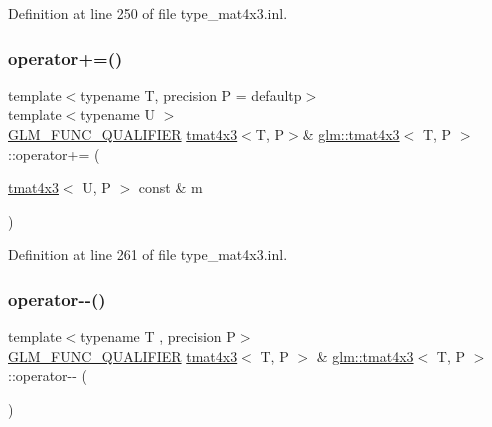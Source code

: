Definition at line 250 of file type\+\_\+mat4x3.\+inl.

\mbox{\label{structglm_1_1tmat4x3_ac3328dbd930d4608781f9199cc793d17}} 
\subsubsection{\texorpdfstring{operator+=()}{operator+=()}\hspace{0.1cm}{\footnotesize\ttfamily [4/4]}}
{\footnotesize\ttfamily template$<$typename T, precision P = defaultp$>$ \\
template$<$typename U $>$ \\
\mbox{\hyperlink{setup_8hpp_a33fdea6f91c5f834105f7415e2a64407}{G\+L\+M\+\_\+\+F\+U\+N\+C\+\_\+\+Q\+U\+A\+L\+I\+F\+I\+ER}} \mbox{\hyperlink{structglm_1_1tmat4x3}{tmat4x3}}$<$T, P$>$\& \mbox{\hyperlink{structglm_1_1tmat4x3}{glm\+::tmat4x3}}$<$ T, P $>$\+::operator+= (\begin{DoxyParamCaption}\item[{\mbox{\hyperlink{structglm_1_1tmat4x3}{tmat4x3}}$<$ U, P $>$ const \&}]{m }\end{DoxyParamCaption})}



Definition at line 261 of file type\+\_\+mat4x3.\+inl.

\mbox{\label{structglm_1_1tmat4x3_ae461258920b150f2cb362db59614ac4a}} 
\subsubsection{\texorpdfstring{operator-\/-\/()}{operator--()}\hspace{0.1cm}{\footnotesize\ttfamily [1/2]}}
{\footnotesize\ttfamily template$<$typename T , precision P$>$ \\
\mbox{\hyperlink{setup_8hpp_a33fdea6f91c5f834105f7415e2a64407}{G\+L\+M\+\_\+\+F\+U\+N\+C\+\_\+\+Q\+U\+A\+L\+I\+F\+I\+ER}} \mbox{\hyperlink{structglm_1_1tmat4x3}{tmat4x3}}$<$ T, P $>$ \& \mbox{\hyperlink{structglm_1_1tmat4x3}{glm\+::tmat4x3}}$<$ T, P $>$\+::operator-\/-\/ (\begin{DoxyParamCaption}{ }\end{DoxyParamCaption})}




